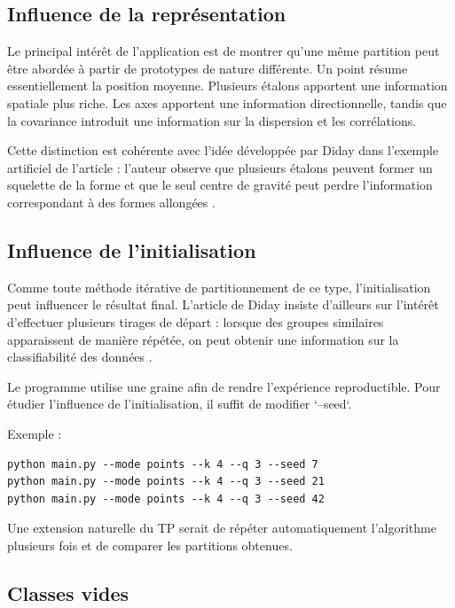 \documentclass[12pt,a4paper]{article}
\begin{document}
\subsection{Influence de la représentation}

Le principal intérêt de l'application est de montrer qu'une même partition peut être abordée à partir de prototypes de nature différente. Un point résume essentiellement la position moyenne. Plusieurs étalons apportent une information spatiale plus riche. Les axes apportent une information directionnelle, tandis que la covariance introduit une information sur la dispersion et les corrélations.

Cette distinction est cohérente avec l'idée développée par Diday dans l'exemple artificiel de l'article : l'auteur observe que plusieurs étalons peuvent former un squelette de la forme et que le seul centre de gravité peut perdre l'information correspondant à des formes allongées \cite[p.~25]{diday1971}.

\subsection{Influence de l'initialisation}

Comme toute méthode itérative de partitionnement de ce type, l'initialisation peut influencer le résultat final. L'article de Diday insiste d'ailleurs sur l'intérêt d'effectuer plusieurs tirages de départ : lorsque des groupes similaires apparaissent de manière répétée, on peut obtenir une information sur la classifiabilité des données \cite[p.~24]{diday1971}.

Le programme utilise une graine afin de rendre l'expérience reproductible. Pour étudier l'influence de l'initialisation, il suffit de modifier `--seed`.

Exemple :

\begin{verbatim}
python main.py --mode points --k 4 --q 3 --seed 7
python main.py --mode points --k 4 --q 3 --seed 21
python main.py --mode points --k 4 --q 3 --seed 42
\end{verbatim}

Une extension naturelle du TP serait de répéter automatiquement l'algorithme plusieurs fois et de comparer les partitions obtenues.

\subsection{Classes vides}
\end{document}
